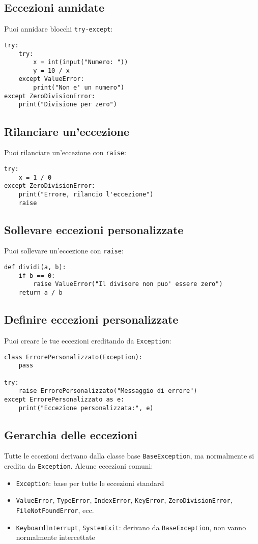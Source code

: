 \documentclass[a4paper,12pt]{article}
\begin{document}
\subsection*{Eccezioni annidate}
Puoi annidare blocchi \texttt{try-except}:
\begin{lstlisting}
try:
    try:
        x = int(input("Numero: "))
        y = 10 / x
    except ValueError:
        print("Non e' un numero")
except ZeroDivisionError:
    print("Divisione per zero")
\end{lstlisting}

\subsection*{Rilanciare un'eccezione}
Puoi rilanciare un'eccezione con \texttt{raise}:
\begin{lstlisting}
try:
    x = 1 / 0
except ZeroDivisionError:
    print("Errore, rilancio l'eccezione")
    raise
\end{lstlisting}

\subsection*{Sollevare eccezioni personalizzate}
Puoi sollevare un'eccezione con \texttt{raise}:
\begin{lstlisting}
def dividi(a, b):
    if b == 0:
        raise ValueError("Il divisore non puo' essere zero")
    return a / b
\end{lstlisting}

\subsection*{Definire eccezioni personalizzate}
Puoi creare le tue eccezioni ereditando da \texttt{Exception}:
\begin{lstlisting}
class ErrorePersonalizzato(Exception):
    pass

try:
    raise ErrorePersonalizzato("Messaggio di errore")
except ErrorePersonalizzato as e:
    print("Eccezione personalizzata:", e)
\end{lstlisting}

\subsection*{Gerarchia delle eccezioni}
Tutte le eccezioni derivano dalla classe base \texttt{BaseException}, ma normalmente si eredita da \texttt{Exception}. Alcune eccezioni comuni:
\begin{itemize}
    \item \texttt{Exception}: base per tutte le eccezioni standard
    \item \texttt{ValueError}, \texttt{TypeError}, \texttt{IndexError}, \texttt{KeyError}, \texttt{ZeroDivisionError}, \texttt{FileNotFoundError}, ecc.
    \item \texttt{KeyboardInterrupt}, \texttt{SystemExit}: derivano da \texttt{BaseException}, non vanno normalmente intercettate
\end{itemize}
\end{document}
